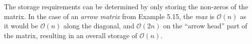 \documentclass[12pt]{article}
\newcommand{\BigO}[1]{\mathcal{O}\left( #1 \right)}
\begin{document}
\begin{enumerate}
The storage requirements can be determined by only storing the non-zeros of the matrix.
In the case of an {\em arrow matrix} from Example 5.15, the {\em max} is $\BigO{n}$
as it would be $\BigO{n}$ along the diagonal, and $\BigO{2n}$ on the ``arrow head''
part of the matrix, resulting in an overall storage of $\BigO{n}$.

\end{enumerate}

\end{document}
